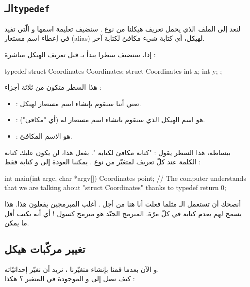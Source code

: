 \subsection{الـ\texttt{typedef}}

لنعد إلى الملف
الذي يحمل تعريف هيكلنا من نوع
.
سنضيف تعليمة اسمها
و الّتي تفيد في إعطاء اسم مستعار
(\textenglish{alias})
لهيكل، أي كتابة شيء مكافئ لكتابة آخر.

إذا، سنضيف سطرا يبدأ بـ
قبل تعريف الهيكل مباشرة :

\begin{Csource}
typedef struct Coordinates Coordinates;
struct Coordinates
{
	int x;
	int y;
};
\end{Csource}

هذا السطر متكون من ثلاثة أجزاء :

\begin{itemize}
  \item {} :
  تعني أننا سنقوم بإنشاء اسم مستعار لهيكل.
  \item {} :
  هو اسم الهيكل الذي سنقوم بانشاء اسم مستعار له (أي "مكافئ").
  \item {} :
  هو الاسم المكافئ.
\end{itemize}

ببساطة، هذا السطر يقول : "كتابة
مكافئ لكتابة
".
بفعل هذا، لن يكون عليك كتابة الكلمة
عند كلّ تعريف لمتغيّر من نوع
.
يمكننا العودة إلى
و كتابة فقط :

\begin{Csource}
int main(int argc, char *argv[])
{
	 Coordinates point; // The computer understands that we are talking about "struct Coordinates" thanks to typedef
   return 0;
}
\end{Csource}

أنصحك أن تستعمل الـ
مثلما فعلت أنا هنا من أجل
.
أغلب المبرمجين يفعلون هذا. هذا يسمح لهم بعدم كتابة
في كلّ مرّة. المبرمج الجيّد هو مبرمج كسول ! أي أنه يكتب أقل ما يمكن.

\subsection{تغيير مركّبات هيكل}

و الآن بعدما قمنا بإنشاء متغيّرنا
،
نريد أن نغيّر إحداثيّاته.\\
كيف نصل إلى
و
الموجودة في المتغير
؟ هكذا :

